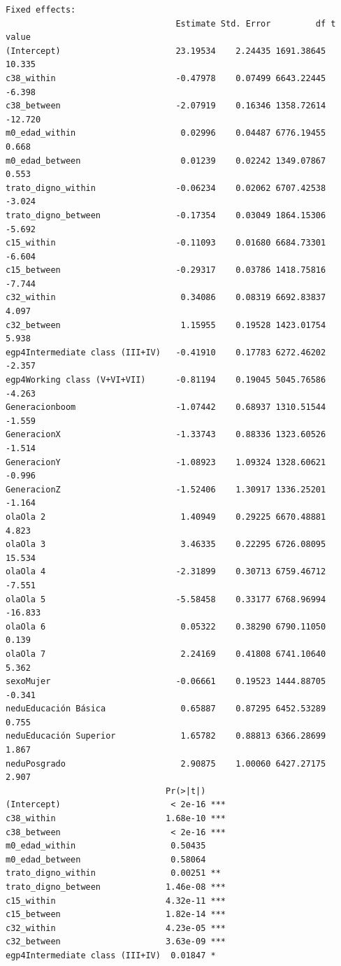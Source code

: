 \documentclass[
  spanish,
  a4paper,
  oneside]{scrbook}
\begin{document}
\begin{verbatim}
Fixed effects:
                                  Estimate Std. Error         df t value
(Intercept)                       23.19534    2.24435 1691.38645  10.335
c38_within                        -0.47978    0.07499 6643.22445  -6.398
c38_between                       -2.07919    0.16346 1358.72614 -12.720
m0_edad_within                     0.02996    0.04487 6776.19455   0.668
m0_edad_between                    0.01239    0.02242 1349.07867   0.553
trato_digno_within                -0.06234    0.02062 6707.42538  -3.024
trato_digno_between               -0.17354    0.03049 1864.15306  -5.692
c15_within                        -0.11093    0.01680 6684.73301  -6.604
c15_between                       -0.29317    0.03786 1418.75816  -7.744
c32_within                         0.34086    0.08319 6692.83837   4.097
c32_between                        1.15955    0.19528 1423.01754   5.938
egp4Intermediate class (III+IV)   -0.41910    0.17783 6272.46202  -2.357
egp4Working class (V+VI+VII)      -0.81194    0.19045 5045.76586  -4.263
Generacionboom                    -1.07442    0.68937 1310.51544  -1.559
GeneracionX                       -1.33743    0.88336 1323.60526  -1.514
GeneracionY                       -1.08923    1.09324 1328.60621  -0.996
GeneracionZ                       -1.52406    1.30917 1336.25201  -1.164
olaOla 2                           1.40949    0.29225 6670.48881   4.823
olaOla 3                           3.46335    0.22295 6726.08095  15.534
olaOla 4                          -2.31899    0.30713 6759.46712  -7.551
olaOla 5                          -5.58458    0.33177 6768.96994 -16.833
olaOla 6                           0.05322    0.38290 6790.11050   0.139
olaOla 7                           2.24169    0.41808 6741.10640   5.362
sexoMujer                         -0.06661    0.19523 1444.88705  -0.341
neduEducación Básica               0.65887    0.87295 6452.53289   0.755
neduEducación Superior             1.65782    0.88813 6366.28699   1.867
neduPosgrado                       2.90875    1.00060 6427.27175   2.907
                                Pr(>|t|)    
(Intercept)                      < 2e-16 ***
c38_within                      1.68e-10 ***
c38_between                      < 2e-16 ***
m0_edad_within                   0.50435    
m0_edad_between                  0.58064    
trato_digno_within               0.00251 ** 
trato_digno_between             1.46e-08 ***
c15_within                      4.32e-11 ***
c15_between                     1.82e-14 ***
c32_within                      4.23e-05 ***
c32_between                     3.63e-09 ***
egp4Intermediate class (III+IV)  0.01847 *  

\end{verbatim}
\end{document}
